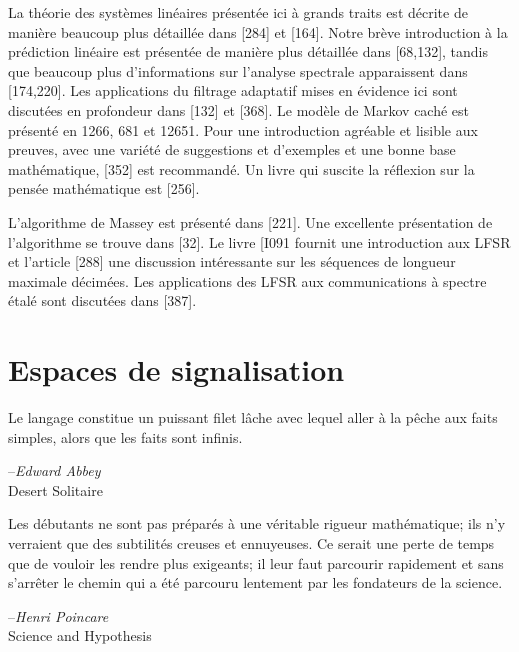 \documentclass[10pt,twoside,a4paper]{book}
\begin{document}
\noindent
La théorie des systèmes linéaires présentée ici à grands traits est décrite de manière beaucoup plus détaillée dans [284] et [164]. 
Notre brève introduction à la prédiction linéaire est présentée de manière plus détaillée dans [68,132], tandis que beaucoup plus d'informations sur l'analyse spectrale apparaissent dans [174,220]. 
Les applications du filtrage adaptatif mises en évidence ici sont discutées en profondeur dans [132] et [368]. Le modèle de Markov caché est présenté en 1266, 681 et 12651. 
Pour une introduction agréable et lisible aux preuves, avec une variété de suggestions et d'exemples et une bonne base mathématique, [352] est recommandé. Un livre qui suscite la réflexion sur la pensée mathématique est [256].

L'algorithme de Massey est présenté dans [221]. Une excellente présentation de l'algorithme se trouve dans [32]. Le livre [I091 fournit une introduction aux LFSR et l'article [288] une discussion intéressante sur les séquences de longueur maximale décimées. 
Les applications des LFSR aux communications à spectre étalé sont discutées dans [387].

\newpage
\thispagestyle{empty}
\newpage

\setcounter{chapter}{1}
\chapter{Espaces de signalisation}

\thispagestyle{empty}

\renewenvironment{quote}{%
  \item\relax
}
{\endlist}

\begin{quote}
  Le langage constitue un puissant filet lâche avec lequel aller à la pêche aux faits simples, alors que les faits sont infinis.
  \begin{flushright}
  {--\textit{Edward Abbey} \\ Desert Solitaire}
  \end{flushright}
\end{quote}
\begin{quote}
  Les débutants ne sont pas préparés à une véritable rigueur mathématique; ils n'y verraient que des subtilités creuses et ennuyeuses. Ce serait une perte de temps que de vouloir les rendre plus exigeants; il leur faut parcourir rapidement et sans s'arrêter le chemin qui a été parcouru lentement par les fondateurs de la science.
  \begin{flushright}
  {--\textit{Henri Poincare} \\ Science and Hypothesis}
  \end{flushright}
\end{quote}
\vspace{7mm}
\end{document}
